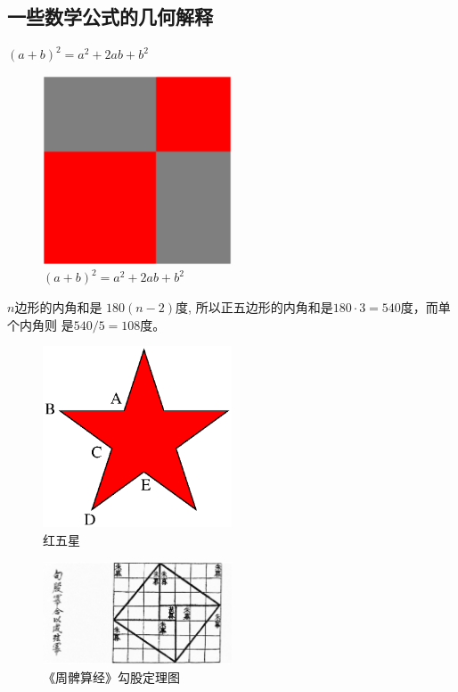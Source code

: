 \documentclass[main.tex]{subfiles}
\begin{document}
\subsection{一些数学公式的几何解释}
$(a+b)^2 = a^2 + 2ab + b^2$


\begin{figure}[h]
    \centering
    \includegraphics[width=0.5\textwidth]{images/ps.1.1.eps}
    \caption{$(a+b)^2 = a^2 + 2ab + b^2$}
    \label{fig:III.1.1}
\end{figure}

\begin{example} $n$边形的内角和是 $180(n-2)$度, 所以正五边形的内角和是$180\cdot 3 = 540$度，而单个内角则 是$540/5 = 108$度。
\end{example}

\begin{figure}[h]
	\centering
	\includegraphics[width=0.5\textwidth]{images/star.eps}
	\caption{红五星}
	\label{fig:III.1.2}
\end{figure}

\begin{figure}[h]
	\centering
	\includegraphics[width=0.5\textwidth]{images/ps/ch_gougu.jpg}
	\caption{《周髀算经》勾股定理图}
	\label{fig:III.1.3}
\end{figure}
\end{document}
